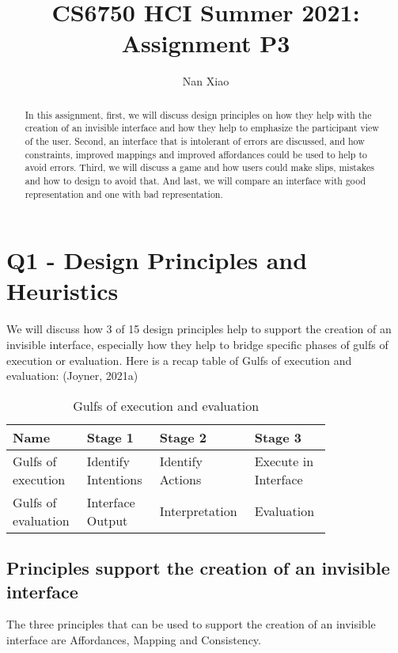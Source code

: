 \documentclass[
	letterpaper, %
]{jdf}
\author{Nan Xiao}
\title{CS6750 HCI Summer 2021:\\Assignment P3}
\begin{document}

\maketitle

\begin{abstract}
	In this assignment, first, we will discuss design principles on how they help with the creation of an invisible interface and how they help to emphasize the participant view of the user. Second, an interface that is intolerant of errors are discussed, and how constraints, improved mappings and improved affordances could be used to help to avoid errors. Third, we will discuss a game and how users could make slips, mistakes and how to design to avoid that. And last, we will compare an interface with good representation and one with bad representation.
\end{abstract}

\section{Q1 - Design Principles and Heuristics}
We will discuss how 3 of 15 design principles help to support the creation of an invisible interface, especially how they help to bridge specific phases of gulfs of execution or evaluation. Here is a recap table of Gulfs of execution and evaluation: (Joyner, 2021a)

\begin{table}[h] %
	\caption{Gulfs of execution and evaluation}
	\small %
	\centering %
	\begin{tabular}{L{0.2\linewidth} C{0.2\linewidth} L{0.2\linewidth} L{0.2\linewidth}}
		\textbf{Name} & \textbf{Stage 1} & \textbf{Stage 2} & \textbf{Stage 3} \\
		\toprule[0.5pt]
		Gulfs of execution & Identify Intentions & Identify Actions & Execute in Interface\\
		\midrule
		Gulfs of evaluation & Interface Output & Interpretation & Evaluation\\
	\end{tabular}
\end{table}

\subsection{Principles support the creation of an invisible interface}
The three principles that can be used to support the creation of an invisible interface are Affordances, Mapping and Consistency.
\end{document}
